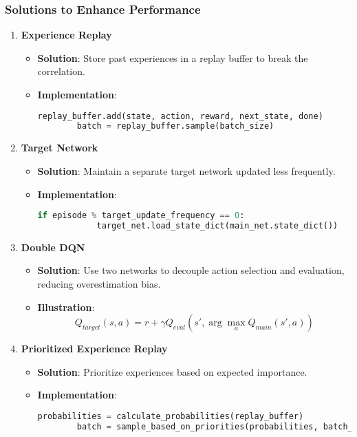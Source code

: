 \documentclass[aspectratio=169]{beamer}
\begin{document}
\begin{frame}[fragile]
  \frametitle{Solutions to Enhance Performance}
  \begin{enumerate}
    \item \textbf{Experience Replay}
      \begin{itemize}
        \item \textbf{Solution}: Store past experiences in a replay buffer to break the correlation.
        \item \textbf{Implementation}:
        \begin{lstlisting}[language=Python]
        replay_buffer.add(state, action, reward, next_state, done)
        batch = replay_buffer.sample(batch_size)
        \end{lstlisting}
      \end{itemize}
      
    \item \textbf{Target Network}
      \begin{itemize}
        \item \textbf{Solution}: Maintain a separate target network updated less frequently.
        \item \textbf{Implementation}:
        \begin{lstlisting}[language=Python]
        if episode % target_update_frequency == 0:
            target_net.load_state_dict(main_net.state_dict())
        \end{lstlisting}
      \end{itemize}
      
    \item \textbf{Double DQN}
      \begin{itemize}
        \item \textbf{Solution}: Use two networks to decouple action selection and evaluation, reducing overestimation bias.
        \item \textbf{Illustration}:
        \begin{equation}
          Q_{target}(s, a) = r + \gamma Q_{eval}(s', \arg\max_a Q_{main}(s', a))
        \end{equation}
      \end{itemize}
      
    \item \textbf{Prioritized Experience Replay}
      \begin{itemize}
        \item \textbf{Solution}: Prioritize experiences based on expected importance.
        \item \textbf{Implementation}:
        \begin{lstlisting}[language=Python]
        probabilities = calculate_probabilities(replay_buffer)
        batch = sample_based_on_priorities(probabilities, batch_size)
        \end{lstlisting}
      \end{itemize}
  \end{enumerate}
\end{frame}
\end{document}
